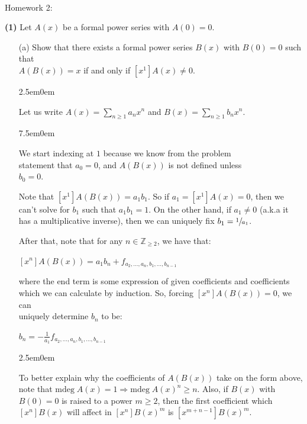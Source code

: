 \documentclass{book}
\newcommand{\exOne}{%
   \color{Purple}%
   \fontsize{13}{15}\selectfont%
}
\newcommand{\exPP}{%
   \color{RedViolet}%
   \fontsize{12}{14}\selectfont%
}
\newenvironment{myIndent}{%
   \begin{adjustwidth}{2.5em}{0em}%
}{%
   \end{adjustwidth}%
}
\newenvironment{myTindent}{%
   \begin{adjustwidth}{7.5em}{0em}%
}{%
   \end{adjustwidth}%
}
\newcommand{\blab}[1]{\textbf{#1}}
\newcommand{\mdeg}{\mathrm{mdeg}\phantom{.}}
\newcommand{\mySepTwo}[1][.]{%
   {\noindent\color{#1}{\rule{6.5in}{0.5mm}}}\\%
}
\newcommand{\retTwo}{\hfill\bigbreak}
\newcommand{\mHeader}[1]{{
   \color{Black}%
   \fontsize{20}{18}\selectfont%
   #1\retTwo
}}
\begin{document}
\mySepTwo

\newpage

\mHeader{Homework 2:}

\blab{(1)} Let $A(x)$ be a formal power series with $A(0) = 0$.\\ [-20pt]
\begin{enumerate}
   \item[(a)] Show that there exists a formal power series $B(x)$ with $B(0) = 0$ such that\\ $A(B(x)) = x$ if and only if $[x^1]A(x) \neq 0$.
   
   \begin{myIndent}\exOne
      Let us write $A(x) = \sum\limits_{n \geq 1}a_nx^n$ and $B(x) = \sum\limits_{n \geq 1}b_nx^n$.\\ [-6pt]
      
      \begin{myTindent}\exPP
         We start indexing at $1$ because we know from the problem\\ statement that $a_0 = 0$, and $A(B(x))$ is not defined unless\\ $b_0 = 0$.\retTwo
      \end{myTindent}

      Note that $[x^1]A(B(x)) = a_1b_1$. So if $a_1 = [x^1]A(x) = 0$, then we can't solve for $b_1$ such that $a_1b_1 = 1$. On the other hand, if $a_1 \neq 0$ (a.k.a it has a multiplicative inverse), then we can uniquely fix $b_1 = \sfrac{1}{a_1}$.\retTwo

      After that, note that for any $n \in \mathbb{Z}_{\geq 2}$, we have that:
      
      {\centering $[x^n]A(B(x)) = a_1b_n + f_{a_2, \ldots, a_{n}, b_1,\ldots, b_{n-1}}$\par}
      
      where the end term is some expression of given coefficients and coefficients which we can calculate by induction. So, forcing $[x^n]A(B(x)) = 0$, we can\\ uniquely determine $b_n$ to be:

      {\centering $b_n = -\frac{1}{a_1}f_{a_2, \ldots, a_{n}, b_1,\ldots, b_{n-1}}$ \retTwo\par}

      \begin{myIndent}\exPP
         To better explain why the coefficients of $A(B(x))$ take on the form above,\\ note that $\mdeg A(x) = 1 \Longrightarrow \mdeg A(x)^n \geq n$. Also, if $B(x)$ with\\ $B(0) = 0$ is raised to a power $m \geq 2$, then the first coefficient which $[x^n]B(x)$ will affect in $[x^n]B(x)^m$ is $[x^{m + n - 1}]B(x)^m$.\retTwo
      \end{myIndent}


\end{myIndent}
\end{enumerate}
\end{document}
